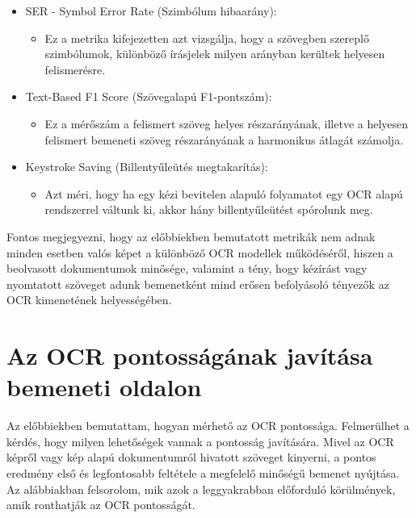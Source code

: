 \documentclass[12pt]{report}
\begin{document}
\begin{itemize}
    \item SER - Symbol Error Rate (Szimbólum hibaarány):
    \begin{itemize}
	   \item Ez a metrika kifejezetten azt vizsgálja, hogy a szövegben szereplő szimbólumok, különböző írásjelek milyen arányban kerültek helyesen felismerésre.
    \end{itemize}
    \item Text-Based F1 Score (Szövegalapú F1-pontszám):
    \begin{itemize}
	   \item Ez a mérőszám a felismert szöveg helyes részarányának, illetve a helyesen felismert bemeneti szöveg részarányának a harmonikus átlagát számolja. \cite{f1_score}
    \end{itemize}
    \item Keystroke Saving (Billentyűleütés megtakarítás):
    \begin{itemize}
	   \item Azt méri, hogy ha egy kézi bevitelen alapuló folyamatot egy OCR alapú rendszerrel váltunk ki, akkor hány billentyűleütést spórolunk meg.
    \end{itemize}
\end{itemize}

\noindent
Fontos megjegyezni, hogy az előbbiekben bemutatott metrikák nem adnak minden esetben valós képet a különböző OCR modellek működéséről, hiszen a beolvasott dokumentumok minősége, valamint a tény, hogy kézírást vagy nyomtatott szöveget adunk bemenetként mind erősen befolyásoló tényezők az OCR kimenetének helyességében.

\section{Az OCR pontosságának javítása bemeneti oldalon}

Az előbbiekben bemutattam, hogyan mérhető az OCR pontossága. Felmerülhet a kérdés, hogy milyen lehetőségek vannak a pontosság javítására. Mivel az OCR képről vagy kép alapú dokumentumról hivatott szöveget kinyerni, a pontos eredmény első és legfontosabb feltétele a megfelelő minőségű bemenet nyújtása. Az alábbiakban felsorolom, mik azok a leggyakrabban előforduló körülmények, amik ronthatják az OCR pontosságát. \cite{imporve_accuracy}
\end{document}

